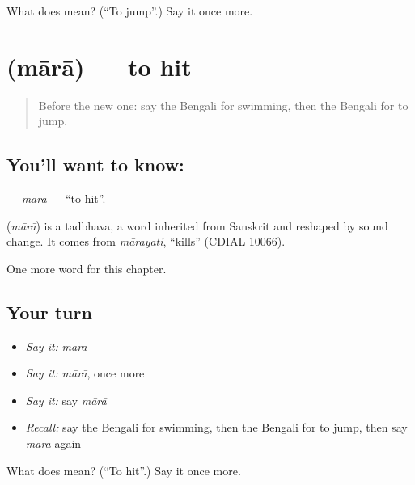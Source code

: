 \begin{tcolorbox}[breakable,colback=teal!4,colframe=teal!35!black,title={Before you move on}]
What does  mean? (\textquotedblleft{}To jump\textquotedblright{}.) Say it once more.
\end{tcolorbox}
\section[\texorpdfstring{\bn{মারা} (mārā)}{মারা (mārā)}]{ (mārā) — to hit}

\label{lesson:BN-C103-mara}



\begin{quote}
Before the new one: say the Bengali for swimming, then the Bengali for to jump.
\end{quote}

\subsection*{You'll want to know: }
\textbf{} — \emph{mārā} — \textquotedblleft{}to hit\textquotedblright{}.

\begin{cousinweb}
\textbf{} (\emph{mārā}) is a tadbhava, a word inherited from Sanskrit and reshaped by sound change. It comes from \emph{mārayati}, \textquotedblleft{}kills\textquotedblright{} (CDIAL 10066).
\end{cousinweb}

\begin{grammarlens}[title={What you've built}]
One more word for this chapter.
\end{grammarlens}

\subsection*{Your turn}
\begin{itemize}
\raggedright
  \item \emph{Say it:} \emph{mārā}
  \item \emph{Say it:} \emph{mārā}, once more
  \item \emph{Say it:} say \emph{mārā}
  \item \emph{Recall:} say the Bengali for swimming, then the Bengali for to jump, then say \emph{mārā} again
\end{itemize}

\begin{tcolorbox}[breakable,colback=teal!4,colframe=teal!35!black,title={Before you move on}]
What does  mean? (\textquotedblleft{}To hit\textquotedblright{}.) Say it once more.
\end{tcolorbox}
